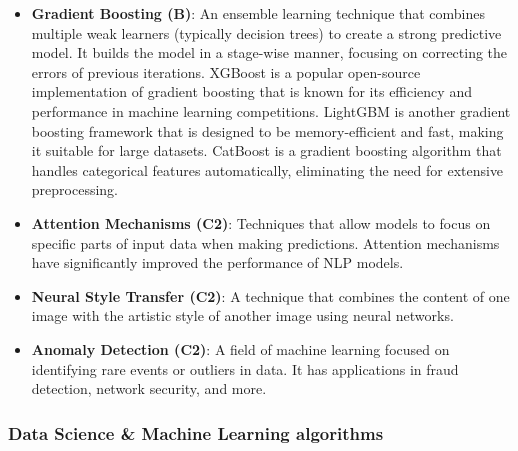 \documentclass{article}
\begin{document}
\begin{itemize}
    \item \textbf{Gradient Boosting (B)}: An ensemble learning technique that combines multiple weak learners (typically decision trees) to create a strong predictive model. It builds the model in a stage-wise manner, focusing on correcting the errors of previous iterations. XGBoost is a popular open-source implementation of gradient boosting that is known for its efficiency and performance in machine learning competitions. LightGBM is another gradient boosting framework that is designed to be memory-efficient and fast, making it suitable for large datasets. CatBoost is a gradient boosting algorithm that handles categorical features automatically, eliminating the need for extensive preprocessing.

    \item \textbf{Attention Mechanisms (C2)}: Techniques that allow models to focus on specific parts of input data when making predictions. Attention mechanisms have significantly improved the performance of NLP models.

    \item \textbf{Neural Style Transfer (C2)}: A technique that combines the content of one image with the artistic style of another image using neural networks.

    \item \textbf{Anomaly Detection (C2)}: A field of machine learning focused on identifying rare events or outliers in data. It has applications in fraud detection, network security, and more.
\end{itemize}


\subsubsection*{Data Science \& Machine Learning algorithms}
\end{document}
